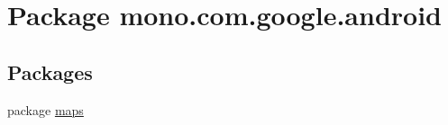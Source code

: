 \hypertarget{namespacemono_1_1com_1_1google_1_1android}{\section{Package mono.\+com.\+google.\+android}
\label{namespacemono_1_1com_1_1google_1_1android}
}
\subsection*{Packages}
\begin{DoxyCompactItemize}
\item 
package \hyperlink{namespacemono_1_1com_1_1google_1_1android_1_1maps}{maps}
\end{DoxyCompactItemize}
